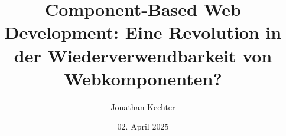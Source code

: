 \documentclass[oneside]{ausarbeitung}
\begin{document}


\Bachelorarbeit

\Informatik
\title{Component-Based Web Development: Eine Revolution in der Wiederverwendbarkeit von Webkomponenten?}

\author{Jonathan Kechter}

\examinerIsAProfessortrue   %


\date{02. April 2025}





\maketitle
\cleardoublepage

\setcounter{page}{1}

\cleardoublepage

\makeaffirmation
\cleardoublepage

\cleardoublepage

\begin{abstract}

\end{abstract}
\cleardoublepage
\tableofcontents

\listoffigures

\listoftables
\end{document}
